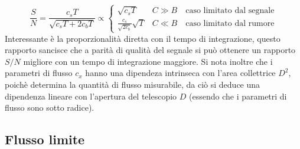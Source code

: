 \begin{equation}
	\label{def:sig-noise-counts}
    \frac{S}{N} = \frac{c_sT}{\sqrt{c_sT+2c_bT}} \propto
    \begin{cases}
        \sqrt{c_sT} & C \gg B \quad \text{caso limitato dal segnale}\\
        \frac{c_s}{\sqrt{2c_b}}\sqrt{T} & C \ll B \quad \text{caso limitato dal rumore}
    \end{cases}
\end{equation}
Interessante è la proporzionalità diretta con il tempo di integrazione, questo rapporto sancisce che a parità di qualità del segnale si può ottenere un rapporto $S/N$ migliore con un tempo di integrazione maggiore. Si nota inoltre che i parametri di flusso $c_x$ hanno una dipendeza intrinseca con l'area collettrice $D^2$, poichè determina la quantità di flusso misurabile, da ciò si deduce una dipendenza lineare con l'apertura del telescopio $D$ (essendo che i parametri di flusso sono sotto radice).

\subsection*{Flusso limite}

